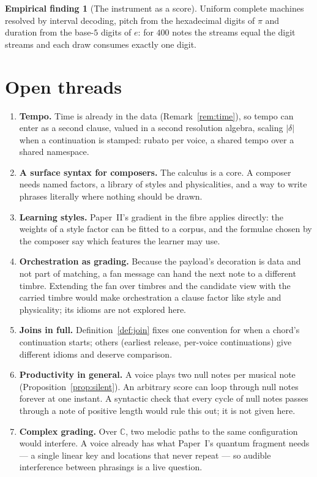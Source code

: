 \documentclass[11pt,a4paper]{article}
\theoremstyle{plain}
\theoremstyle{definition}
\newtheorem{finding}[theorem]{Empirical finding}
\theoremstyle{remark}
\newcommand{\Cx}{\mathbb{C}}
\newcommand{\len}[1]{|#1|}
\begin{document}
\begin{finding}[The instrument as a score]\label{find:embed}
Uniform complete machines resolved by interval decoding, pitch from the
hexadecimal digits of $\pi$ and duration from the base-$5$ digits of $e$: for
$400$ notes the streams equal the digit streams and each draw consumes exactly
one digit.
\end{finding}

\section{Open threads}\label{sec:open}

\begin{enumerate}[leftmargin=*,itemsep=3pt]
\item \textbf{Tempo.} Time is already in the data (Remark~\ref{rem:time}), so
  tempo can enter as a second clause, valued in a second resolution algebra,
  scaling $\len{\delta}$ when a continuation is stamped: rubato per voice, a
  shared tempo over a shared namespace.
\item \textbf{A surface syntax for composers.} The calculus is a core. A
  composer needs named factors, a library of styles and physicalities, and
  a way to write phrases literally where nothing should be drawn.
\item \textbf{Learning styles.} Paper~II's gradient in the fibre applies
  directly: the weights of a style factor can be fitted to a corpus, and the
  formulae chosen by the composer say which features the learner may use.
\item \textbf{Orchestration as grading.} Because the payload's decoration is
  data and not part of matching, a fan message can hand the next note to a
  different timbre. Extending the fan over timbres and the candidate view with
  the carried timbre would make orchestration a clause factor like style and
  physicality; its idioms are not explored here.
\item \textbf{Joins in full.} Definition~\ref{def:join} fixes one convention for
  when a chord's continuation starts; others (earliest release, per-voice
  continuations) give different idioms and deserve comparison.
\item \textbf{Productivity in general.} A voice plays two null notes per
  musical note (Proposition~\ref{prop:silent}). An arbitrary score can loop
  through null notes forever at one instant. A syntactic check that every cycle
  of null notes passes through a note of positive length would rule this out;
  it is not given here.
\item \textbf{Complex grading.} Over $\Cx$, two melodic paths to the same
  configuration would interfere. A voice already has what Paper~I's quantum
  fragment needs --- a single linear key and locations that never repeat ---
  so audible interference between phrasings is a live question.
\end{enumerate}
\end{document}
